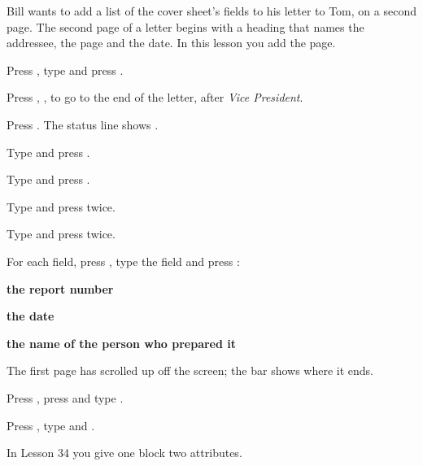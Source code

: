 Bill wants to add a list of the cover sheet's fields to his letter to Tom,
on a second page.  The second page of a letter begins with a heading that
names the addressee, the page and the date.  In this lesson you add the
page.

\begin{WPSteps}
\item Press , type  and press
.
\item Press , ,  to go to the end
of the letter, after \textit{Vice President}.
\item Press .  The status line shows .
\end{WPSteps}

\begin{WPSteps}
\item Type  and press .
\item Type  and press .
\item Type  and press  twice.
\end{WPSteps}

\begin{WPSteps}
\item Type  and press 
twice.
\item For each field, press , type the field and
press :
\end{WPSteps}
\par\addvspace{2pt}
\begingroup\setlength\parskip{1pt}
\noindent\hspace*{4mm}\textbf{the report number}\par
\noindent\hspace*{4mm}\textbf{the date}\par
\noindent\hspace*{4mm}\textbf{the name of the person who prepared it}\par
\endgroup
\par\addvspace{4pt}
The first page has scrolled up off the screen; the bar shows where it ends.

\begin{WPSteps}
\item Press , press  and type .
\item Press , type  and .
\end{WPSteps}
\EndReplay
In Lesson 34 you give one block two attributes.
